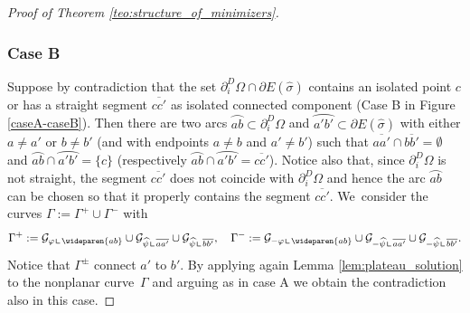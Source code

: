 \documentclass[JEP,XML,SOM,Unicode, NoFloatCountersInSection,published]{cedram}
\let\arc\wideparen
\let\Om\Omega
\newcommand{\resa}{\mathop{\hbox{\vrule height 7pt width 0.5pt depth 0pt
\vrule height 0.5pt width 6pt depth 0pt}}\nolimits}
\newcommand{\resb}{\mathop{\hbox{\vrule height 4pt width 0.5pt depth 0pt
\vrule height 0.5pt width 3pt depth 0pt}}\nolimits}
\newcommand{\res}{\mathchoice{\resa}{\resa}{\resb}{\resb}}
\theoremstyle{definition}
\begin{document}
\begin{proof}[Proof of Theorem \ref{teo:structure_of_minimizers}]
\subsubsection*{Case B} Suppose by contradiction that the set $\partial_i^D\Om\cap\partial E(\widehat\sigma)$ contains an isolated point $c$ or has a straight segment $\overline{cc'}$ as isolated connected component (Case B in Figure \ref{caseA-caseB}).
Then there are two arcs $\arc{ab}\subset\partial_i^D\Om$ and $\arc{a'b'}\subset\partial E(\widehat\sigma)$ with either $a\neq a'$ or $b\neq b'$ (and with endpoints $a\ne b$ and $a'\ne b'$) such that $\overline{aa'}\cap\overline{bb'}=\emptyset$ and $\arc{ab}\cap\arc{a'b'}=\{c\}$ (respectively $\arc{ab}\cap\arc{a'b'}=\overline{cc'}$). Notice also that, since $\partial_i^D\Om$ is not straight, the segment $\overline{cc'}$ does not coincide with $\partial_i^D\Om$ and hence the arc $\arc{ab}$ can be chosen so that it properly contains the segment $\overline{cc'}$. We~consider the curves $\Gamma:=\Gamma^+\cup\Gamma^-$ with
\begin{equation}\label{eq:gamma}
\Gamma^+:=\mathcal{G}_{\varphi\res\arc{ab}}
\cup\mathcal{G}_{\widehat\psi\res\overline{aa'}}\cup\mathcal{G}_{\widehat\psi\res\overline{bb'}}
,\quad
\Gamma^-:=\mathcal{G}_{-\varphi\res\arc{ab}}
\cup\mathcal{G}_{-\widehat\psi\res\overline{aa'}}
\cup\mathcal{G}_{-\widehat\psi\res\overline{bb'}}.
\end{equation}
Notice that $\Gamma^\pm$ connect $a'$ to $b'$.
By applying again Lemma \ref{lem:plateau_solution} to the nonplanar curve~$\Gamma$ and arguing as in case A we obtain the contradiction also in this case.


\end{proof}
\end{document}
